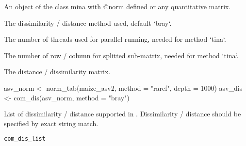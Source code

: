 \documentclass[a4paper]{book}
\begin{document}
%
\begin{Arguments}
\begin{ldescription}
\item[\code{x}] An object of the class mina with @norm defined or any quantitative
matrix.

\item[\code{method}] The dissimilarity / distance method used, default `bray`.

\item[\code{threads}] The number of threads used for parallel running, needed for
method `tina`.

\item[\code{nblocks}] The number of row / column for splitted sub-matrix, needed for
method `tina`.
\end{ldescription}
\end{Arguments}
%
\begin{Value}
The distance / dissimilarity matrix.
\end{Value}
%
\begin{Examples}
\begin{ExampleCode}
asv_norm <- norm_tab(maize_asv2, method = "raref", depth = 1000)
asv_dis <- com_dis(asv_norm, method = "bray")
\end{ExampleCode}
\end{Examples}
%
\begin{Description}\relax
List of dissimilarity / distance supported in .
Dissimilarity / distance should be specified by exact string match.
\end{Description}
%
\begin{Usage}
\begin{verbatim}
com_dis_list
\end{verbatim}
\end{Usage}
%
\end{document}
